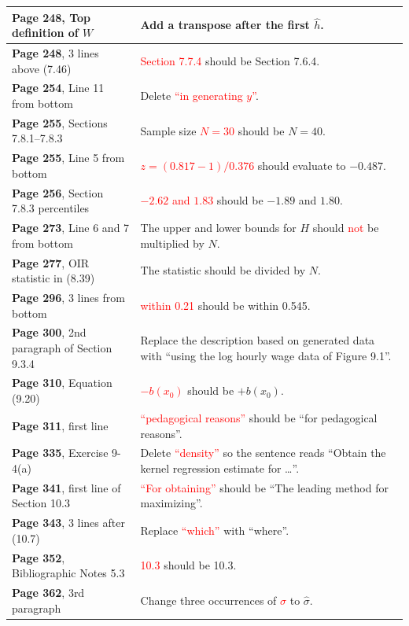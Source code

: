 \documentclass[10pt, a4paper]{article}
\newcommand{\red}[1]{\textcolor{red}{#1}}
\newcommand{\green}[1]{\textcolor{green!50!black}{#1}}
\begin{document}
\begin{longtable}{|R{.41\textwidth}|R{.57\textwidth}|}
	\textbf{Page 248}, Top definition of $W$ & Add a transpose after the first \green{$\widehat h$}. \\ \hline
	\textbf{Page 248}, 3 lines above (7.46) & \red{Section 7.7.4} should be \green{Section 7.6.4}. \\ \hline
	\textbf{Page 254}, Line 11 from bottom & Delete \red{``in generating $y$''}. \\ \hline
	\textbf{Page 255}, Sections 7.8.1--7.8.3 & Sample size \red{$N=30$} should be \green{$N=40$}. \\ \hline
	\textbf{Page 255}, Line 5 from bottom & \red{$z=(0.817-1)/0.376$} should evaluate to \green{$-0.487$}. \\ \hline
	\textbf{Page 256}, Section 7.8.3 percentiles & \red{$-2.62$ and $1.83$} should be \green{$-1.89$ and $1.80$}. \\ \hline
	\textbf{Page 273}, Line 6 and 7 from bottom \hfill {} & The upper and lower bounds for $H$ should \red{not} be multiplied by \green{$N$}. \\ \hline
	\textbf{Page 277}, OIR statistic in (8.39) \hfill {} & The statistic should be divided by \green{$N$}. \\ \hline
	\textbf{Page 296}, 3 lines from bottom & \red{within 0.21} should be \green{within 0.545}. \\ \hline
	\textbf{Page 300}, 2nd paragraph of Section 9.3.4 & Replace the description based on generated data with \green{``using the log hourly wage data of Figure 9.1''}. \\ \hline
	\textbf{Page 310}, Equation (9.20) & \red{$-b(x_0)$} should be \green{$+b(x_0)$}. \\ \hline
	\textbf{Page 311}, first line & \red{``pedagogical reasons''} should be \green{``for pedagogical reasons''}. \\ \hline
	\textbf{Page 335}, Exercise 9-4(a) & Delete \red{``density''} so the sentence reads \green{``Obtain the kernel regression estimate for \ldots''}. \\ \hline
	\textbf{Page 341}, first line of Section 10.3 & \red{``For obtaining''} should be \green{``The leading method for maximizing''}. \\ \hline
	\textbf{Page 343}, 3 lines after (10.7) & Replace \red{``which''} with \green{``where''}. \\ \hline
	\textbf{Page 352}, Bibliographic Notes 5.3 & \red{10.3} should be \green{10.3}. \\ \hline
	\textbf{Page 362}, 3rd paragraph & Change three occurrences of \red{$\sigma$} to \green{$\widehat{\sigma}$}. \\ \hline

\end{longtable}
\end{document}
